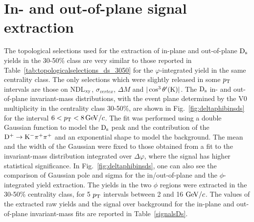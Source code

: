  \section{In- and out-of-plane signal extraction}
 \label{sec:SigExtracV2}
 The topological selections used for the extraction of
 in-plane and out-of-plane ${\rm D_s}$ yields in the 30-50\% class
 are very similar to those reported in Table~\ref{tab:topologicalselections_ds_3050} for the
 $\varphi$-integrated yield in the same centrality class.
 The only selections which were slightly released in some $p_{\rm T}$
 intervals are those
 on NDL$_{\rm xy}$, $\sigma_{vertex}$, $\Delta M$ and $|\cos^3 \theta^\prime({\rm K})|$.
The ${\rm D_s}$ in- and out-of-plane invariant-mass distributions, 
with the event plane determined by the V0 multiplicity 
in the centrality class 30-50\%, are shown in Fig.~\ref{fig:deltaphibinsds} 
for the interval $6 < p_{\rm T} < 8 \, \mathrm{GeV}/c$.
The fit was performed using a double Gaussian function to model 
the ${\rm D_s}$ peak and the contribution of the ${\rm D^+\to K^-\pi^+\pi^+}$ and 
an exponential shape to model the background.
The mean and the width of the Gaussian were fixed to those obtained from a fit to
the invariant-mass distribution integrated over $\Delta \varphi$, 
where the signal has higher statistical significance. 
In Fig.~\ref{fig:deltaphibinsds}, one can also see the comparison of Gaussian pole and 
sigma for the in/out-of-plane and the $\phi$-integrated yield extraction.
The yields in the two $\phi$ regions were extracted in the 30-50\% centrality
class, for 5 $p_{\rm T}$ intervals between 2 and 16 $\mathrm{GeV}/c$.
The values of the extracted raw yields and the signal over 
background for the in-plane and out-of-plane invariant-mass fits 
are reported in Table~\ref{signalsDs}.

